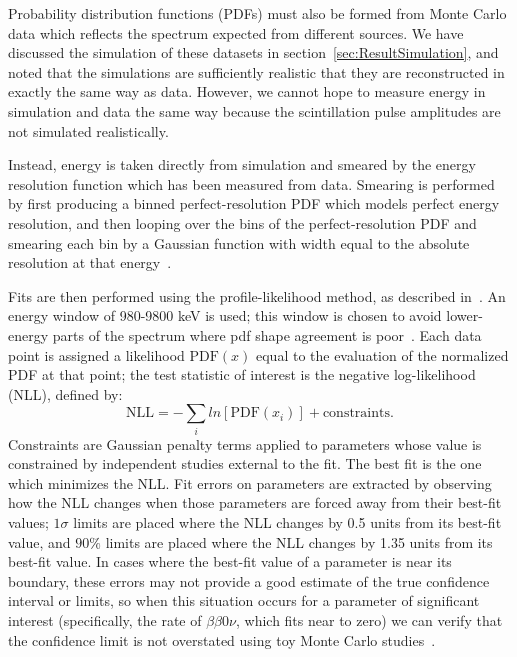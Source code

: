 Probability distribution functions (PDFs) must also be formed from Monte Carlo data which reflects the spectrum expected from different sources.  We have discussed the simulation of these datasets in section~\ref{sec:ResultSimulation}, and noted that the simulations are sufficiently realistic that they are reconstructed in exactly the same way as data.  However, we cannot hope to measure energy in simulation and data the same way because the scintillation pulse amplitudes are not simulated realistically.

Instead, energy is taken directly from simulation and smeared by the energy resolution function which has been measured from data.  Smearing is performed by first producing a binned perfect-resolution PDF which models perfect energy resolution, and then looping over the bins of the perfect-resolution PDF and smearing each bin by a Gaussian function with width equal to the absolute resolution at that energy~\cite{FittingDocument}.

Fits are then performed using the profile-likelihood method, as described in~\cite{ProfileLikelihood}.  An energy window of 980-9800 keV is used; this window is chosen to avoid lower-energy parts of the spectrum where pdf shape agreement is poor~\cite{NewEXObb0nPaper_2014}.  Each data point is assigned a likelihood $\text{PDF}(x)$ equal to the evaluation of the normalized PDF at that point; the test statistic of interest is the negative log-likelihood (NLL), defined by:
\begin{equation}
\text{NLL} = -\sum_i ln\left[\text{PDF}(x_i)\right] + \text{constraints}.
\end{equation}
Constraints are Gaussian penalty terms applied to parameters whose value is constrained by independent studies external to the fit.  The best fit is the one which minimizes the NLL.  Fit errors on parameters are extracted by observing how the NLL changes when those parameters are forced away from their best-fit values; $1\sigma$ limits are placed where the NLL changes by 0.5 units from its best-fit value, and $90\%$ limits are placed where the NLL changes by 1.35 units from its best-fit value.  In cases where the best-fit value of a parameter is near its boundary, these errors may not provide a good estimate of the true confidence interval or limits, so when this situation occurs for a parameter of significant interest (specifically, the rate of $\beta\beta 0\nu$, which fits near to zero) we can verify that the confidence limit is not overstated using toy Monte Carlo studies~\cite{FittingDocument}.

